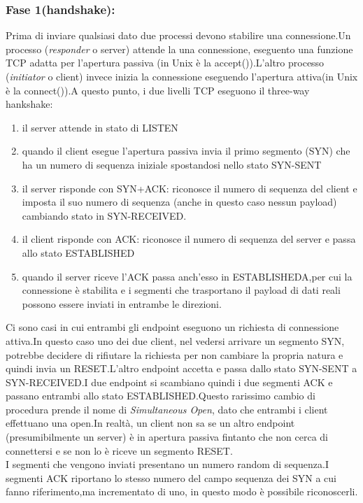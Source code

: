 \subsubsection{Fase 1(handshake):}
Prima di inviare qualsiasi dato due processi devono stabilire una connessione.Un processo (\textit{responder} o server) attende la una connessione, eseguento una funzione TCP adatta per l'apertura passiva (in Unix è la accept()).L'altro processo (\textit{initiator} o client) invece inizia la connessione eseguendo l'apertura attiva(in Unix è la connect()).A questo punto, i due livelli TCP eseguono il three-way hankshake:
\begin{enumerate}
  \item il server attende in stato di LISTEN
  \item quando il client esegue l'apertura passiva invia il primo segmento (SYN) che ha un numero di sequenza iniziale spostandosi nello stato SYN-SENT
  \item il server risponde con SYN+ACK: riconosce il numero di sequenza del client e imposta il suo numero di sequenza (anche in questo caso nessun payload) cambiando stato in SYN-RECEIVED.
  \item il client risponde con ACK: riconosce il numero di sequenza del server e passa allo stato ESTABLISHED
  \item  quando il server riceve l'ACK passa anch'esso in ESTABLISHEDA,per cui la connessione è stabilita e i segmenti che trasportano il payload di dati reali possono essere inviati in entrambe le direzioni.
\end{enumerate}
Ci sono casi in cui entrambi gli endpoint eseguono un richiesta di connessione attiva.In questo caso uno dei due client, nel vedersi arrivare un segmento SYN, potrebbe decidere di rifiutare la richiesta per non cambiare la propria natura e quindi invia un RESET.L'altro endpoint accetta e passa dallo stato SYN-SENT a SYN-RECEIVED.I due endpoint si scambiano quindi i due segmenti ACK e passano entrambi allo stato ESTABLISHED.Questo rarissimo cambio di procedura prende il nome di \textit{Simultaneous Open}, dato che entrambi i client effettuano una open.In realtà, un client non sa se un altro endpoint (presumibilmente un server) è in apertura passiva fintanto che non cerca di connettersi e se non lo è riceve un segmento RESET.\\
I segmenti che vengono inviati presentano un numero random di sequenza.I segmenti ACK riportano lo stesso numero del campo sequenza dei SYN a cui fanno riferimento,ma incrementato di uno, in questo modo è possibile riconoscerli.
